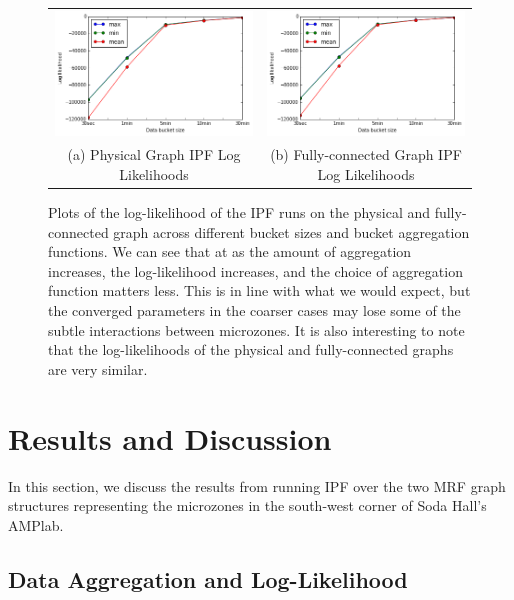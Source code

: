 \begin{figure}[ht]
\centering
\begin{tabular}{cc}
\includegraphics[width=.4\linewidth]{figs/physical_loglikelihood} & \includegraphics[width=.4\linewidth]{figs/full_loglikelihood} \\
(a) Physical Graph IPF Log Likelihoods & (b) Fully-connected Graph IPF Log Likelihoods \\[6pt]
\end{tabular}
\caption{Plots of the log-likelihood of the IPF runs on the physical and fully-connected graph across different bucket sizes and bucket aggregation functions. We can see that at as the amount of aggregation increases, the log-likelihood increases, and the choice of aggregation function matters less. This is in line with what we would expect, but the converged parameters in the coarser cases may lose some of the subtle interactions between microzones.
It is also interesting to note that the log-likelihoods of the physical and fully-connected graphs are very similar.}
\label{fig:loglikelihood}
\end{figure}

\section{Results and Discussion}


In this section, we discuss the results from running IPF over the two MRF graph structures representing the microzones in the south-west corner of Soda Hall's AMPlab.

\subsection{Data Aggregation and Log-Likelihood}

